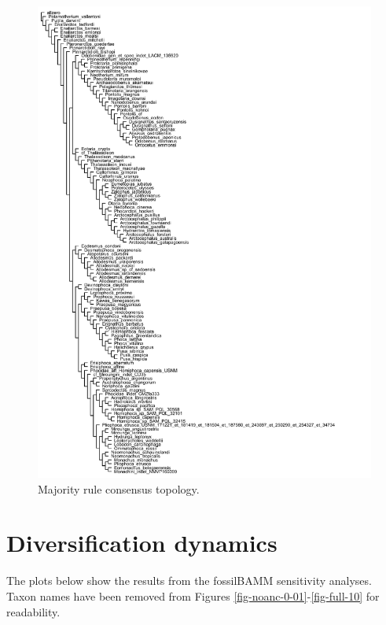 \documentclass[a4paper, 12pt]{article}
\begin{document}
\begin{figure}[H]
  \centering
  \includegraphics[width = \linewidth]{figures/STR_MRC.pdf}
  \caption{Majority rule consensus topology.}
  \label{fig-mrc}
\end{figure}

\newpage
\section{Diversification dynamics}

The plots below show the results from the fossilBAMM sensitivity analyses. 
Taxon names have been removed from Figures \ref{fig-noanc-0-01}-\ref{fig-full-10} for readability.
\end{document}

